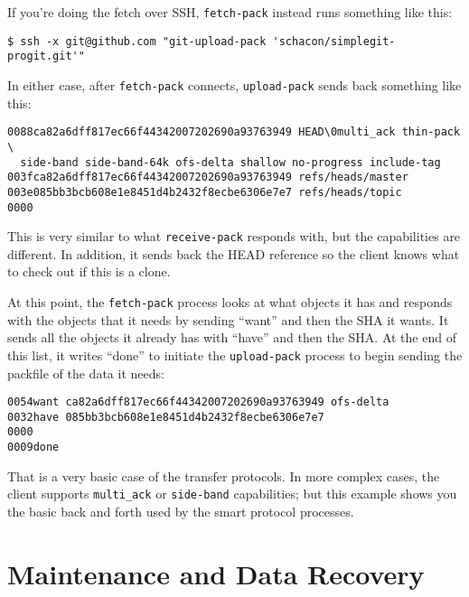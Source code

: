 \documentclass[a4paper]{book}
\begin{document}
If you're doing the fetch over SSH, \texttt{fetch-pack} instead runs something like this:

\begin{shaded}\begin{verbatim}
$ ssh -x git@github.com "git-upload-pack 'schacon/simplegit-progit.git'"
\end{verbatim}\end{shaded}

In either case, after \texttt{fetch-pack} connects, \texttt{upload-pack} sends back something like this:

\begin{shaded}\begin{verbatim}
0088ca82a6dff817ec66f44342007202690a93763949 HEAD\0multi_ack thin-pack \
  side-band side-band-64k ofs-delta shallow no-progress include-tag
003fca82a6dff817ec66f44342007202690a93763949 refs/heads/master
003e085bb3bcb608e1e8451d4b2432f8ecbe6306e7e7 refs/heads/topic
0000
\end{verbatim}\end{shaded}

This is very similar to what \texttt{receive-pack} responds with, but the capabilities are different. In addition, it sends back the HEAD reference so the client knows what to check out if this is a clone.

At this point, the \texttt{fetch-pack} process looks at what objects it has and responds with the objects that it needs by sending “want” and then the SHA it wants. It sends all the objects it already has with “have” and then the SHA. At the end of this list, it writes “done” to initiate the \texttt{upload-pack} process to begin sending the packfile of the data it needs:

\begin{shaded}\begin{verbatim}
0054want ca82a6dff817ec66f44342007202690a93763949 ofs-delta
0032have 085bb3bcb608e1e8451d4b2432f8ecbe6306e7e7
0000
0009done
\end{verbatim}\end{shaded}

That is a very basic case of the transfer protocols. In more complex cases, the client supports \texttt{multi\_ack} or \texttt{side-band} capabilities; but this example shows you the basic back and forth used by the smart protocol processes.

\section{Maintenance and Data Recovery}\label{maintenance-and-data-recovery}
\end{document}
